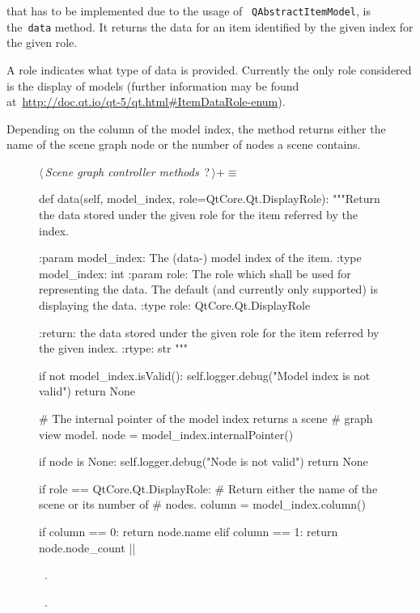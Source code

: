 \documentclass[%
    a4paper,    %
    justified,  %
    nobib,      %
    openany     %
]{tufte-book}
\begin{document}
 that has to be implemented due to the usage of
~\verb=QAbstractItemModel=, is the~\verb=data= method. It returns the data for
an item identified by the given index for the given role.

A role indicates what type of data is provided. Currently the only role
considered is the display of models (further information may be found
at~\url{http://doc.qt.io/qt-5/qt.html#ItemDataRole-enum}).

Depending on the column of the model index, the method returns either the name
of the scene graph node or the number of nodes a scene contains.

\begin{figure}
\begin{flushleft} \small
\begin{minipage}{\linewidth}\label{scrap35}\raggedright\small
{} $\langle\,${\itshape Scene graph controller methods}\nobreak\ {\footnotesize {?}}$\,\rangle+\equiv$
\vspace{-1ex}
\begin{pythoncode}
def data(self, model_index, role=QtCore.Qt.DisplayRole):
    """Return the data stored under the given role for the item
    referred by the index.

    :param model_index: The (data-) model index of the item.
    :type model_index: int
    :param role: The role which shall be used for representing
                 the data. The default (and currently only
                 supported) is displaying the data.
    :type role:  QtCore.Qt.DisplayRole

    :return: the data stored under the given role for the item
             referred by the given index.
    :rtype:  str
    """

    if not model_index.isValid():
        self.logger.debug("Model index is not valid")
        return None

    # The internal pointer of the model index returns a scene
    # graph view model.
    node = model_index.internalPointer()

    if node is None:
        self.logger.debug("Node is not valid")
        return None

    if role == QtCore.Qt.DisplayRole:
        # Return either the name of the scene or its number of
        # nodes.
        column = model_index.column()

        if column == 0:
            return node.name
        elif column == 1:
            return node.node_count
|\NWsep|
\end{pythoncode}
\vspace{1.5ex}
\footnotesize
\begin{list}{}{\setlength{\itemsep}{-\parsep}\setlength{\itemindent}{-\leftmargin}}
\item \NWtxtMacroDefBy\ .
\item \NWtxtMacroRefIn\ .


\end{list}
\end{minipage}
\end{flushleft}
\end{figure}
\end{document}
